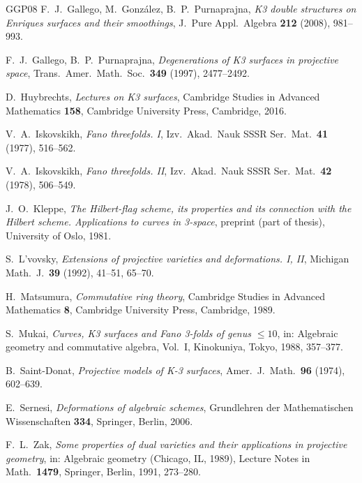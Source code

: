 \documentclass[11pt,reqno]{amsart}
\theoremstyle{plain}
\theoremstyle{definition}
\begin{document}
\begin{thebibliography}{GGP08}
 F.~J.~Gallego, M.~Gonz\'alez, B.~P.~Purnaprajna, \emph{K3 double structures on Enriques surfaces and their smoothings}, J.\ Pure Appl.\ Algebra \textbf{212} (2008), 981--993.

 F.~J.~Gallego, B.~P.~Purnaprajna, \emph{Degenerations of K3 surfaces in projective space}, Trans.\ Amer.\ Math.\ Soc.\ \textbf{349} (1997), 2477--2492.

 D.~Huybrechts, \emph{Lectures on K3 surfaces}, Cambridge Studies in Advanced Mathematics \textbf{158}, Cambridge University Press, Cambridge, 2016.

 V.~A.~Iskovskikh, \emph{Fano threefolds. I}, Izv.\ Akad.\ Nauk SSSR Ser.\ Mat.\ \textbf{41} (1977), 516--562.

 V.~A.~Iskovskikh, \emph{Fano threefolds. II}, Izv.\ Akad.\ Nauk SSSR Ser.\ Mat.\ \textbf{42} (1978), 506--549.

 J.~O.~Kleppe, \emph{The Hilbert-flag scheme, its properties and its connection with the Hilbert scheme. Applications to curves in 3-space}, preprint (part of thesis), University of Oslo, 1981.

 S.~L'vovsky, \emph{Extensions of projective varieties and deformations. I, II}, Michigan Math.\ J.\ \textbf{39} (1992), 41--51, 65--70.

 H.~Matsumura, \emph{Commutative ring theory}, Cambridge Studies in Advanced Mathematics \textbf{8}, Cambridge University Press, Cambridge, 1989.

 S.~Mukai, \emph{Curves, K3 surfaces and Fano 3-folds of genus $\le 10$}, in: Algebraic geometry and commutative algebra, Vol.~I, Kinokuniya, Tokyo, 1988, 357--377.

 B.~Saint-Donat, \emph{Projective models of K-3 surfaces}, Amer.\ J.\ Math.\ \textbf{96} (1974), 602--639.

 E.~Sernesi, \emph{Deformations of algebraic schemes}, Grundlehren der Mathematischen Wissenschaften \textbf{334}, Springer, Berlin, 2006.

 F.~L.~Zak, \emph{Some properties of dual varieties and their applications in projective geometry}, in: Algebraic geometry (Chicago, IL, 1989), Lecture Notes in Math.\ \textbf{1479}, Springer, Berlin, 1991, 273--280.


\end{thebibliography}
\end{document}
